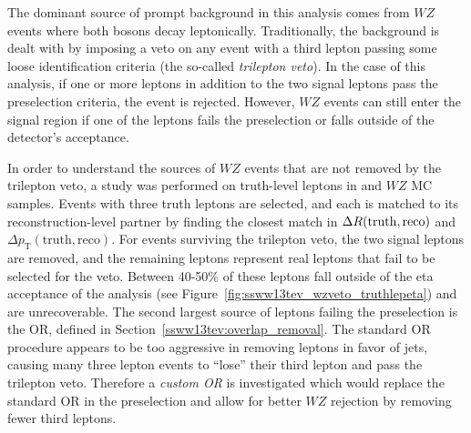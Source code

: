 The dominant source of prompt background in this analysis comes from $WZ$ events where both bosons decay leptonically.
Traditionally, the background is dealt with by imposing a veto on any event with a third lepton passing some loose identification criteria (the so-called \emph{trilepton veto}).
In the case of this analysis, if one or more leptons in addition to the two signal leptons pass the preselection criteria, the event is rejected.
However, $WZ$ events can still enter the signal region if one of the leptons fails the preselection or falls outside of the detector's acceptance.

In order to understand the sources of $WZ$ events that are not removed by the trilepton veto, a study was performed on truth-level leptons in \ssww and $WZ$ MC samples.
Events with three truth leptons are selected, and each is matched to its reconstruction-level partner by finding the closest match in $\Delta R(\textrm{truth},\textrm{reco})$ and $\Delta p_{\textrm{T}}(\textrm{truth},\textrm{reco})$.
For events surviving the trilepton veto, the two signal leptons are removed, and the remaining leptons represent real leptons that fail to be selected for the veto.
Between 40-50\% of these leptons fall outside of the eta acceptance of the analysis (see Figure~\ref{fig:ssww13tev_wzveto_truthlepeta}) and are unrecoverable.
The second largest source of leptons failing the preselection is the OR, defined in Section~\ref{ssww13tev:overlap_removal}.
The standard OR procedure appears to be too aggressive in removing leptons in favor of jets, causing many three lepton events to ``lose'' their third lepton and pass the trilepton veto.
Therefore a \emph{custom OR} is investigated which would replace the standard OR in the preselection and allow for better $WZ$ rejection by removing fewer third leptons.

